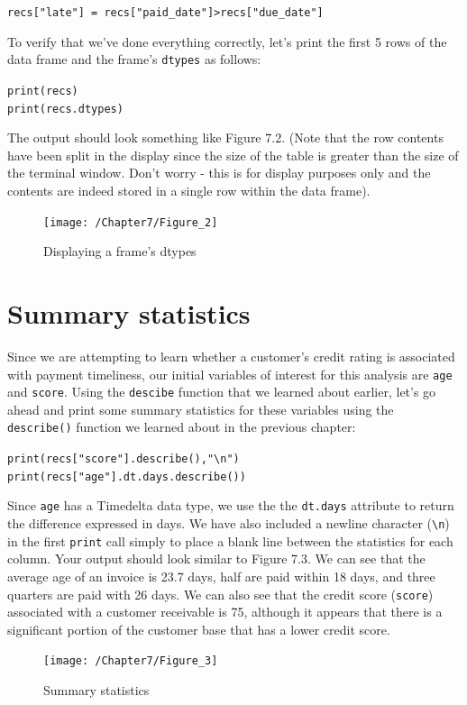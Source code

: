 \documentclass{book}
\begin{document}
\texttt{recs["late"] = recs["paid\_date"]>recs["due\_date"]}

To verify that we've done everything correctly, let's print the first 5 rows of the data frame and the frame's \texttt{dtypes} as follows:

\texttt{print(recs) \\ print(recs.dtypes)}

The output should look something like Figure 7.2. (Note that the row contents have been split in the display since the size of the table is greater than the size of the terminal window. Don't worry - this is for display purposes only and the contents are indeed stored in a single row within the data frame).

\begin{figure}[h]
	\caption{Displaying a frame's dtypes}
	\centering\texttt{[image: /Chapter7/Figure\_2]}
\end{figure}

\section{Summary statistics}

Since we are attempting to learn whether a customer's credit rating is associated with payment timeliness, our initial variables of interest for this analysis are \texttt{age} and \texttt{score}. Using the \texttt{descibe} function that we learned about earlier, let's go ahead and print some summary statistics for these variables using the \texttt{describe()} function we learned about in the previous chapter:

\texttt{print(recs["score"].describe(),"\textbackslash n") \\print(recs["age"].dt.days.describe())}

Since \texttt{age} has a Timedelta data type, we use the the \texttt{dt.days} attribute to return the difference expressed in days. We have also included a newline character (\texttt{\textbackslash n}) in the first \texttt{print} call simply to place a blank line between the statistics for each column. Your output should look similar to Figure 7.3. We can see that the average age of an invoice is 23.7 days, half are paid within 18 days, and three quarters are paid with 26 days. We can also see that the credit score (\texttt{score}) associated with a customer receivable is 75, although it appears that there is a significant portion of the customer base that has a lower credit score.

\begin{figure}[h]
	\caption{Summary statistics}
	\centering\texttt{[image: /Chapter7/Figure\_3]}
\end{figure}
\end{document}
